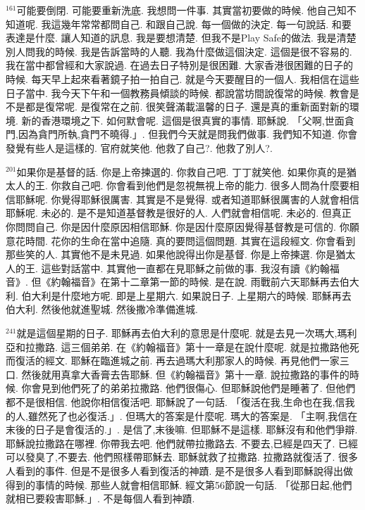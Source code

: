 \documentclass{book}
\begin{document}
$^{161}$可能要倒閉.
可能要重新洗底.
我想問一件事.
其實當初要做的時候.
他自己知不知道呢.
我這幾年常常都問自己.
和跟自己說.
每一個做的決定.
每一句說話.
和要表達是什麼.
讓人知道的訊息.
我是要想清楚.
但我不是Play Safe的做法.
我是清楚別人問我的時候.
我是告訴當時的人聽.
我為什麼做這個決定.
這個是很不容易的.
我在當中都曾經和大家說過.
在過去日子特別是很困難.
大家香港很困難的日子的時候.
每天早上起來看著鏡子拍一拍自己.
就是今天要醒目的一個人.
我相信在這些日子當中.
我今天下午和一個教務員傾談的時候.
都說當坊間說復常的時候.
教會是不是都是復常呢.
是復常在之前.
很笑聲滿載溫馨的日子.
還是真的重新面對新的環境.
新的香港環境之下.
如何默會呢.
這個是很真實的事情.
耶穌說.
「父啊,世面貪門,因為貪門所執,貪門不曉得.」.
但我們今天就是問我們做事.
我們知不知道.
你會發覺有些人是這樣的.
官府就笑他.
他救了自己?.
他救了別人?.

$^{201}$如果你是基督的話.
你是上帝揀選的.
你救自己吧.
丁丁就笑他.
如果你真的是猶太人的王.
你救自己吧.
你會看到他們是忽視無視上帝的能力.
很多人問為什麼要相信耶穌呢.
你覺得耶穌很厲害.
其實是不是覺得.
或者知道耶穌很厲害的人就會相信耶穌呢.
未必的.
是不是知道基督教是很好的人.
人們就會相信呢.
未必的.
但真正你問問自己.
你是因什麼原因相信耶穌.
你是因什麼原因覺得基督教是可信的.
你願意花時間.
花你的生命在當中追隨.
真的要問這個問題.
其實在這段經文.
你會看到那些笑的人.
其實他不是未見過.
如果他說得出你是基督.
你是上帝揀選.
你是猶太人的王.
這些對話當中.
其實他一直都在見耶穌之前做的事.
我沒有讀《約翰福音》.
但《約翰福音》在第十二章第一節的時候.
是在說.
雨戰前六天耶穌再去伯大利.
伯大利是什麼地方呢.
即是上星期六.
如果說日子.
上星期六的時候.
耶穌再去伯大利.
然後他就進聖城.
然後撒冷準備進城.

$^{241}$就是這個星期的日子.
耶穌再去伯大利的意思是什麼呢.
就是去見一次瑪大,瑪利亞和拉撒路.
這三個弟弟.
在《約翰福音》第十一章是在說什麼呢.
就是拉撒路他死而復活的經文.
耶穌在臨進城之前.
再去過瑪大利那家人的時候.
再見他們一家三口.
然後就用真拿大香膏去告耶穌.
但《約翰福音》第十一章.
說拉撒路的事件的時候.
你會見到他們死了的弟弟拉撒路.
他們很傷心.
但耶穌說他們是睡著了.
但他們都不是很相信.
他說你相信復活吧.
耶穌說了一句話.
「復活在我,生命也在我,信我的人,雖然死了也必復活.」.
但瑪大的答案是什麼呢.
瑪大的答案是.
「主啊,我信在末後的日子是會復活的.」.
是信了,末後嘛.
但耶穌不是這樣.
耶穌沒有和他們爭辯.
耶穌說拉撒路在哪裡.
你帶我去吧.
他們就帶拉撒路去.
不要去,已經是四天了.
已經可以發臭了,不要去.
他們照樣帶耶穌去.
耶穌就救了拉撒路.
拉撒路就復活了.
很多人看到的事件.
但是不是很多人看到復活的神蹟.
是不是很多人看到耶穌說得出做得到的事情的時候.
那些人就會相信耶穌.
經文第56節說一句話.
「從那日起,他們就相已要殺害耶穌.」.
不是每個人看到神蹟.
\end{document}
